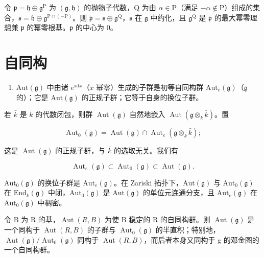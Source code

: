 令 \(\mathfrak{p} = \mathfrak{h} \oplus \mathfrak{g}^{\mathrm{P}}\) 为 \((\mathfrak{g}, \mathfrak{h})\) 的抛物子代数，Q 为由 \(\alpha \in \mathrm{P}\)（满足 \(-\alpha \notin \mathrm{P}\)）组成的集合，\(\mathfrak{s} = \mathfrak{h} \oplus \mathfrak{g}^{\mathrm{P} \cap (-\mathrm{P})}\)。则 \(\mathfrak{p} = \mathfrak{s} \oplus \mathfrak{g}^{\mathrm{Q}}\)，\(\mathfrak{s}\) 在 \(\mathfrak{g}\) 中约化，且 \(\mathfrak{g}^{\mathrm{Q}}\) 是 \(\mathfrak{p}\) 的最大幂零理想兼 \(\mathfrak{p}\) 的幂零根基。\(\mathfrak{p}\) 的中心为 0。

\section*{自同构}

\begin{enumerate}
\def\labelenumi{\arabic{enumi})}
\setcounter{enumi}{15}
\tightlist
\item
  \(\mathrm{Aut}(\mathfrak{g})\) 中由诸 \(e^{\mathrm{ad}x}\)（\(x\) 幂零）生成的子群是初等自同构群 \(\mathrm{Aut}_e(\mathfrak{g})\)（\(\mathfrak{g}\) 的）；它是 \(\mathrm{Aut}(\mathfrak{g})\) 的正规子群；它等于自身的换位子群。
\end{enumerate}

若 \(\bar{k}\) 是 \(k\) 的代数闭包，则群 \(\operatorname{Aut}(\mathfrak{g})\) 自然地嵌入 \(\operatorname{Aut}(\mathfrak{g} \otimes_k \bar{k})\)。置

\[
\operatorname{Aut} _ {0} (\mathfrak {g}) = \operatorname{Aut} (\mathfrak {g}) \cap \operatorname{Aut} _ {e} (\mathfrak {g} \otimes_ {k} \bar {k});
\]

这是 \(\operatorname{Aut}(\mathfrak{g})\) 的正规子群，与 \(\bar{k}\) 的选取无关。我们有

\[
\operatorname{Aut} _ {e} (\mathfrak {g}) \subset \operatorname{Aut} _ {0} (\mathfrak {g}) \subset \operatorname{Aut} (\mathfrak {g}).
\]

\(\mathrm{Aut}_0(\mathfrak{g})\) 的换位子群是 \(\mathrm{Aut}_e(\mathfrak{g})\)。在 Zariski 拓扑下，\(\mathrm{Aut}(\mathfrak{g})\) 与 \(\mathrm{Aut}_0(\mathfrak{g})\) 在 \(\mathrm{End}_k(\mathfrak{g})\) 中闭，\(\mathrm{Aut}_0(\mathfrak{g})\) 是 \(\mathrm{Aut}(\mathfrak{g})\) 的单位元连通分支，且 \(\mathrm{Aut}_e(\mathfrak{g})\) 在 \(\mathrm{Aut}_0(\mathfrak{g})\) 中稠密。

令 B 为 R 的基，\(\operatorname{Aut}(R,B)\) 为使 B 稳定的 R 的自同构群。则 \(\operatorname{Aut}(\mathfrak{g})\) 是一个同构于 \(\operatorname{Aut}(R,B)\) 的子群与 \(\operatorname{Aut}_{0}(\mathfrak{g})\) 的半直积；特别地，\(\operatorname{Aut}(\mathfrak{g})/\operatorname{Aut}_{0}(\mathfrak{g})\) 同构于 \(\operatorname{Aut}(R,B)\)，而后者本身又同构于 g 的邓金图的一个自同构群。

